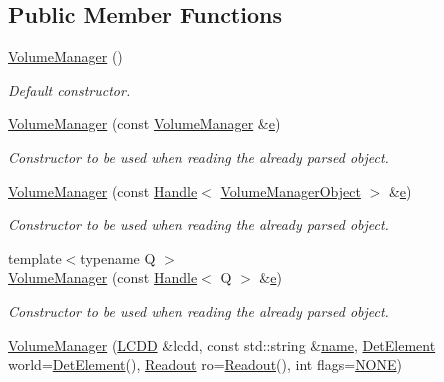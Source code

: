 \subsection*{Public Member Functions}
\begin{DoxyCompactItemize}
\item 
\hyperlink{class_d_d4hep_1_1_geometry_1_1_volume_manager_a5dc0919df1764151f01b9c026f957a5b}{Volume\+Manager} ()
\begin{DoxyCompactList}\small\item\em Default constructor. \end{DoxyCompactList}\item 
\hyperlink{class_d_d4hep_1_1_geometry_1_1_volume_manager_aea6772fb6a92c17765eb90c3362f59b6}{Volume\+Manager} (const \hyperlink{class_d_d4hep_1_1_geometry_1_1_volume_manager}{Volume\+Manager} \&\hyperlink{_volumes_8cpp_a8a9a1f93e9b09afccaec215310e64142}{e})
\begin{DoxyCompactList}\small\item\em Constructor to be used when reading the already parsed object. \end{DoxyCompactList}\item 
\hyperlink{class_d_d4hep_1_1_geometry_1_1_volume_manager_abb2a930f5dbb6da83d03a6b17f81d3ee}{Volume\+Manager} (const \hyperlink{class_d_d4hep_1_1_handle}{Handle}$<$ \hyperlink{class_d_d4hep_1_1_geometry_1_1_volume_manager_object}{Volume\+Manager\+Object} $>$ \&\hyperlink{_volumes_8cpp_a8a9a1f93e9b09afccaec215310e64142}{e})
\begin{DoxyCompactList}\small\item\em Constructor to be used when reading the already parsed object. \end{DoxyCompactList}\item 
{\footnotesize template$<$typename Q $>$ }\\\hyperlink{class_d_d4hep_1_1_geometry_1_1_volume_manager_ad80e8aa0bda5daacfa73164d2e8630ee}{Volume\+Manager} (const \hyperlink{class_d_d4hep_1_1_handle}{Handle}$<$ Q $>$ \&\hyperlink{_volumes_8cpp_a8a9a1f93e9b09afccaec215310e64142}{e})
\begin{DoxyCompactList}\small\item\em Constructor to be used when reading the already parsed object. \end{DoxyCompactList}\item 
\hyperlink{class_d_d4hep_1_1_geometry_1_1_volume_manager_a3d11859d5bd8a89d64108af31afa4e1d}{Volume\+Manager} (\hyperlink{class_d_d4hep_1_1_geometry_1_1_l_c_d_d}{L\+C\+DD} \&lcdd, const std\+::string \&\hyperlink{class_d_d4hep_1_1_handle_a27c7d467a609ab32c133e1f3c7d85ef5}{name}, \hyperlink{class_d_d4hep_1_1_geometry_1_1_det_element}{Det\+Element} world=\hyperlink{class_d_d4hep_1_1_geometry_1_1_det_element}{Det\+Element}(), \hyperlink{class_d_d4hep_1_1_geometry_1_1_readout}{Readout} ro=\hyperlink{class_d_d4hep_1_1_geometry_1_1_readout}{Readout}(), int flags=\hyperlink{class_d_d4hep_1_1_geometry_1_1_volume_manager_a1c25b37c1377654bf2fbe1cf4743ebdea8562837522298e9c40ab9cd35d9307ba}{N\+O\+NE})

\end{DoxyCompactItemize}
